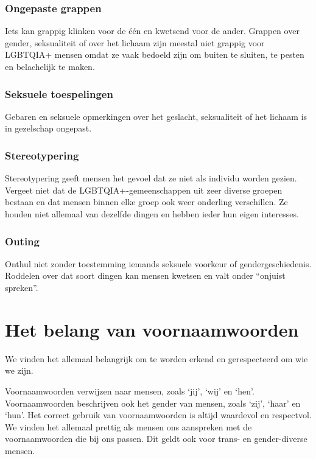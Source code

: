 \documentclass[12pt,openany]{book}
\begin{document}
\subsubsection*{Ongepaste grappen} 

Iets kan grappig klinken voor de één en kwetsend voor de ander. Grappen over gender, seksualiteit of over het lichaam zijn meestal niet grappig voor LGBTQIA+ mensen omdat ze vaak bedoeld zijn om buiten te sluiten, te pesten en belachelijk te maken. 

\subsubsection*{Seksuele toespelingen}

Gebaren en seksuele opmerkingen over het geslacht, seksualiteit of het lichaam is in gezelschap ongepast.

\subsubsection*{Stereotypering}

Stereotypering geeft mensen het gevoel dat ze niet als individu worden gezien. Vergeet niet dat de LGBTQIA+-gemeenschappen uit zeer diverse groepen bestaan en dat mensen binnen elke groep ook weer onderling verschillen. Ze houden niet allemaal van dezelfde dingen en hebben ieder hun eigen interesses. 

\subsubsection*{Outing}

Onthul niet zonder toestemming iemands seksuele voorkeur of gendergeschiedenis. Roddelen over dat soort dingen kan mensen kwetsen en valt onder “onjuist spreken”.

\section*{Het belang van voornaamwoorden}

We vinden het allemaal belangrijk om te worden erkend en gerespecteerd om wie we zijn.

Voornaamwoorden verwijzen naar mensen, zoals ‘jij’, ‘wij’ en ‘hen’. Voornaamwoorden beschrijven ook het gender van mensen, zoals ‘zij’, ‘haar’ en ‘hun’. Het correct gebruik van voornaamwoorden is altijd waardevol en respectvol. We vinden het allemaal prettig als mensen ons aanspreken met de voornaamwoorden die bij ons passen. Dit geldt ook voor trans- en gender-diverse mensen. 
\end{document}
